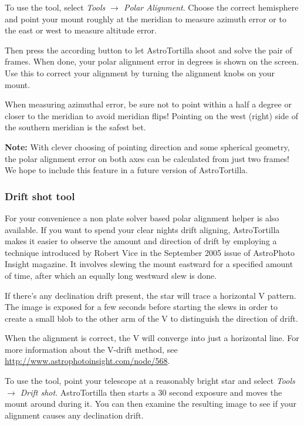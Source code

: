 \documentclass[english]{article}
\newcommand{\surl}[1]{{\small \url{#1}}}
\begin{document}
To use the tool, select \emph{Tools $\rightarrow$ Polar Alignment}. Choose the
correct hemisphere and point your mount roughly at the meridian to measure
azimuth error or to the east or west to measure altitude error.

Then press the according button to let AstroTortilla shoot and solve the pair
of frames. When done, your polar alignment error in degrees is shown on the
screen. Use this to correct your alignment by turning the alignment knobs on
your mount.

When measuring azimuthal error, be sure not to point within a half a degree or
closer to the meridian to avoid meridian flips! Pointing on the west (right)
side of the southern meridian is the safest bet.

{\footnotesize \textbf{Note:} With clever choosing of pointing direction and some
spherical geometry, the polar alignment error on both axes can be calculated from 
just two frames! We hope to include this feature in a future version of AstroTortilla.}

\subsubsection{Drift shot tool}

For your convenience a non plate solver based polar alignment helper is also available.
If you want to spend your clear nights drift aligning, AstroTortilla makes it 
easier to observe the amount and direction of drift by
employing a technique introduced by Robert Vice in the September 2005 issue of
AstroPhoto Insight magazine. It involves slewing the mount eastward for a
specified amount of time, after which an equally long westward slew is done.

If there's any declination drift present, the star will trace a horizontal V
pattern. The image is exposed for a few seconds before starting the slews in
order to create a small blob to the other arm of the V to distinguish the
direction of drift.

When the alignment is correct, the V will converge into just a horizontal line.
For more information about the V-drift method, see
\surl{http://www.astrophotoinsight.com/node/568}.

To use the tool, point your telescope at a reasonably bright star and select
\emph{Tools $\rightarrow$ Drift shot}.  AstroTortilla then starts a 30 second
exposure and moves the mount around during it. You can then examine the
resulting image to see if your alignment causes any declination drift.
\end{document}

